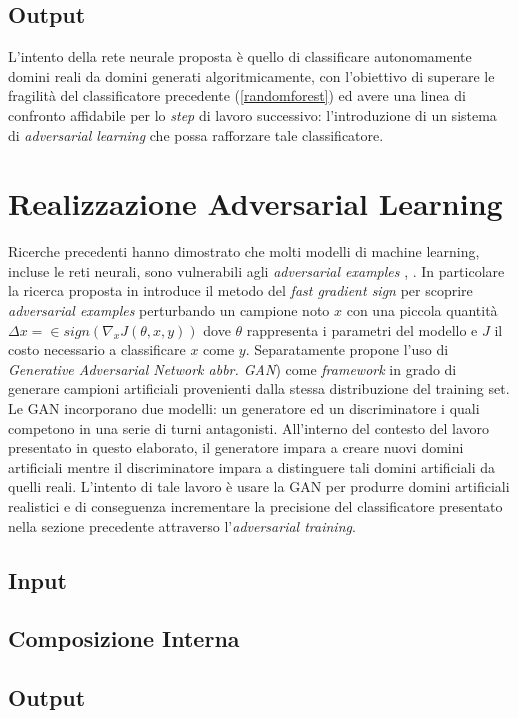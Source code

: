 \subsection{Output}
\label{classificatorennoutput}
L'intento della rete neurale proposta è quello di classificare autonomamente domini reali da domini generati algoritmicamente, con l'obiettivo di superare le fragilità del classificatore precedente (\ref{randomforest}) ed avere una linea di confronto affidabile per lo \textit{step} di lavoro successivo: l'introduzione di un sistema di \textit{adversarial learning} che possa rafforzare tale classificatore. 

\section{Realizzazione Adversarial Learning}
\label{adv}
Ricerche precedenti hanno dimostrato che molti modelli di machine learning, incluse le reti neurali, sono vulnerabili agli \textit{adversarial examples} \cite{1312.6199},  \cite{1412.6572} . In particolare la ricerca proposta in \cite{1412.6572} introduce il metodo del \textit{fast gradient sign} per scoprire \textit{adversarial examples} perturbando un campione noto $x$ con una piccola quantità $\Delta x =  \in sign(\nabla_x J(\theta,x,y))$ dove $\theta$ rappresenta i parametri del modello e $J$ il costo necessario a classificare $x$ come $y$.
Separatamente \cite{1406.2661} propone l'uso di \textit{Generative Adversarial Network abbr. GAN})  come \textit{framework} in grado di generare campioni artificiali provenienti dalla stessa distribuzione del training set.
Le GAN incorporano due modelli: un generatore ed un discriminatore i quali competono in una serie di turni antagonisti. All'interno del contesto del lavoro presentato in questo elaborato, il generatore impara a creare nuovi domini artificiali mentre il discriminatore impara a distinguere tali domini artificiali da quelli reali. L'intento di tale lavoro è usare la GAN per produrre domini artificiali realistici e di conseguenza incrementare la precisione del classificatore presentato nella sezione precedente attraverso l'\textit{adversarial training}.

\subsection{Input}
\label{advinput}

\subsection{Composizione Interna}
\label{advinterno}

\subsection{Output}
\label{advoutput}

